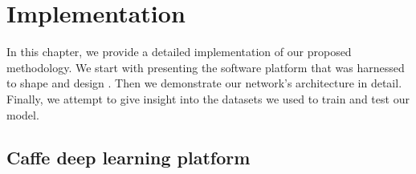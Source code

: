 
\chapter{Implementation}
\label{sec:implementation}
\noindent

\noindent In this chapter, we provide a detailed implementation of our proposed methodology. We start with presenting the software platform that was harnessed to shape and design . Then we demonstrate our network's architecture in detail. Finally, we attempt to give insight into the datasets we used to train and test our model. 

\section{Caffe deep learning platform}

